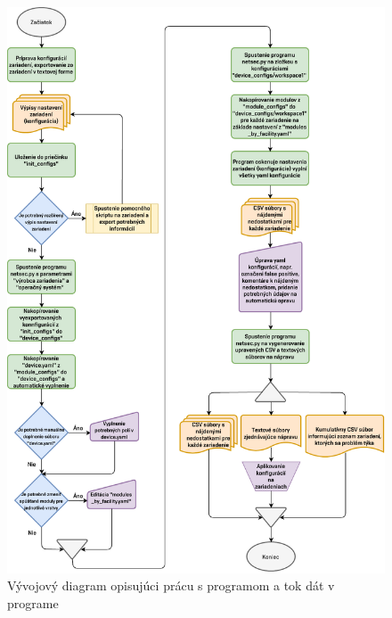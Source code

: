\begin{figure}[H]
	\begin{center}
		\vspace*{-1cm}\includegraphics[scale=0.8]{obrazky/flowchart.pdf}
	\end{center}
	\caption[Vývojový diagram opisujúci prácu s programom a tok dát v programe]{Vývojový diagram opisujúci prácu s programom a tok dát v programe}
	\label{workflow}
\end{figure}

 

